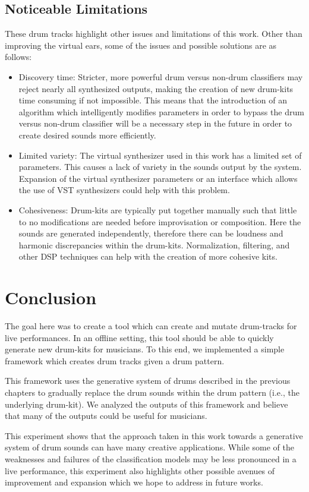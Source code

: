 \documentclass[\main/thesis.tex]{subfiles}
\begin{document}
\subsection{Noticeable Limitations}
 These drum tracks highlight other issues and limitations of this work. Other than improving the virtual ears, some of the issues and possible solutions are as follows:
~\begin{itemize}
    \item  Discovery time: Stricter,  more  powerful  drum  versus  non-drum  classifiers may reject nearly all synthesized outputs, making the creation of new drum-kits time consuming if not impossible. This means that the introduction of an algorithm which intelligently  modifies  parameters  in  order  to  bypass  the  drum  versus  non-drum classifier will be a necessary step in the future in order to create desired sounds more efficiently.
    
    \item Limited variety: The virtual synthesizer used in this work has a limited set of parameters. This causes a lack of variety in the sounds output by the system. Expansion of the virtual synthesizer parameters or an interface which allows the use of VST synthesizers could help with this problem.
    
    \item Cohesiveness: Drum-kits are typically put together manually such that little to no modifications are needed before improvisation or composition. Here the sounds are generated independently, therefore there can be loudness and harmonic discrepancies within the drum-kits. Normalization, filtering, and other DSP techniques can help with the creation of more cohesive kits. 
\end{itemize}
\section{Conclusion}
The goal here was to create a tool which can create and mutate drum-tracks for live performances. In an offline setting, this tool should be able to quickly generate new drum-kits for musicians. To this end, we implemented a simple framework which creates drum tracks given a drum pattern. 

This framework uses the generative system of drums described in the previous chapters to gradually replace the drum sounds within the drum pattern (i.e., the underlying drum-kit). We analyzed the outputs of this framework and believe that many of the outputs could be useful for musicians. 

 This experiment shows that the approach taken in this work towards a generative system of drum sounds can have many creative applications. While some of the weaknesses and failures of the classification models may be less pronounced in a live performance, this experiment also highlights other possible avenues of improvement and expansion which we hope to address in future works.
\end{document}
